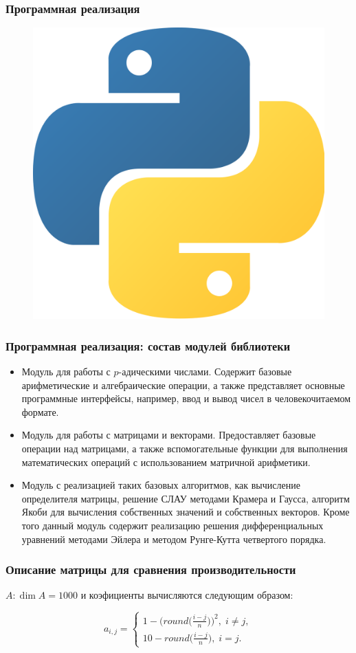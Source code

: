 \documentclass[10pt,professionalfont,utf8,presentation,compress]{beamer}
\theoremstyle{definition}
\theoremstyle{plain}
\begin{document}
\begin{frame}
\frametitle{Программная реализация}
	\begin{figure}[H]
	\centerline{\includegraphics[width=0.5\linewidth]{images/python.png}}
	\end{figure}
\end{frame}


\begin{frame}
\frametitle{Программная реализация: состав модулей библиотеки}
\begin{itemize}
\item Модуль для работы с $p$-адическими числами. Содержит базовые арифметические и алгебраические операции, а также представляет основные программные интерфейсы, например, ввод и вывод чисел в человекочитаемом формате.
\item Модуль для работы с матрицами и векторами. Предоставляет базовые операции над матрицами, а также вспомогательные функции для выполнения математических операций с использованием матричной арифметики.
\item Модуль с реализацией таких базовых алгоритмов, как вычисление определителя матрицы, решение СЛАУ методами Крамера и Гаусса, алгоритм Якоби для вычисления собственных значений и собственных векторов. Кроме того данный модуль содержит реализацию решения дифференциальных уравнений методами Эйлера и методом Рунге-Кутта четвертого порядка.
\end{itemize}
\end{frame}


\begin{frame}
\frametitle{Описание матрицы для сравнения производительности}

$A: \dim{A} = 1000$ и коэфициенты вычисляются следующим образом:

\begin{equation}
a_{i,j}=
\begin{cases}
1-\bigg(round\bigg(\frac{i-j}{n}\bigg)\bigg)^2, \; i \neq j, \\
10-round\bigg(\frac{i-j}{n}\bigg), \; i = j.
\end{cases}
\end{equation}
\end{frame}
\end{document}
